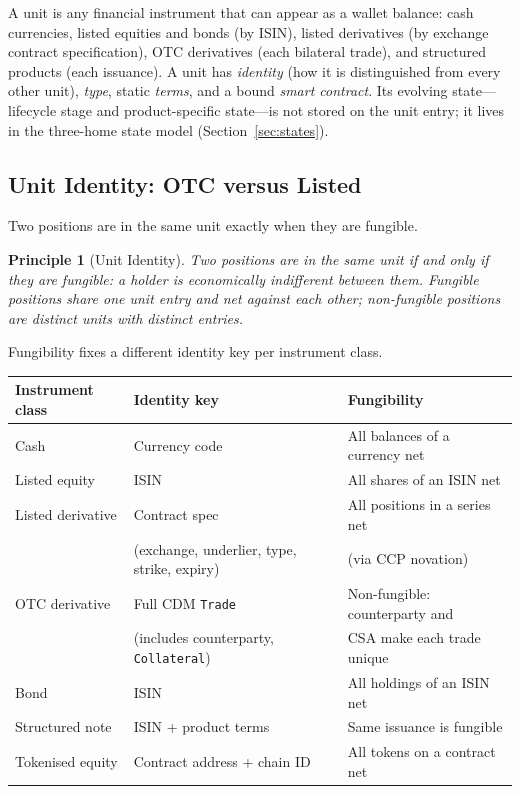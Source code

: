 \documentclass[11pt,a4paper]{article}
\newtheorem{principle}[definition]{Principle}
\begin{document}
A unit is any financial instrument that can appear as a wallet balance: cash currencies, listed equities and bonds (by ISIN), listed derivatives (by exchange contract specification), OTC derivatives (each bilateral trade), and structured products (each issuance). A unit has \emph{identity} (how it is distinguished from every other unit), \emph{type}, static \emph{terms}, and a bound \emph{smart contract}. Its evolving state---lifecycle stage and product-specific state---is not stored on the unit entry; it lives in the three-home state model (Section~\ref{sec:states}).

\subsection{Unit Identity: OTC versus Listed}
\label{sec:unit-identity}

Two positions are in the same unit exactly when they are fungible.

\begin{principle}[Unit Identity]
\label{prin:unit-identity}
Two positions are in the same unit if and only if they are fungible: a holder is economically indifferent between them. Fungible positions share one unit entry and net against each other; non-fungible positions are distinct units with distinct entries.
\end{principle}

Fungibility fixes a different identity key per instrument class.

\begin{center}
\small
\begin{tabular}{lll}
\toprule
\textbf{Instrument class} & \textbf{Identity key} & \textbf{Fungibility} \\
\midrule
Cash & Currency code & All balances of a currency net \\
Listed equity & ISIN & All shares of an ISIN net \\
Listed derivative & Contract spec & All positions in a series net \\
 & (exchange, underlier, type, strike, expiry) & (via CCP novation) \\
OTC derivative & Full CDM \texttt{Trade} & Non-fungible: counterparty and \\
 & (includes counterparty, \texttt{Collateral}) & CSA make each trade unique \\
Bond & ISIN & All holdings of an ISIN net \\
Structured note & ISIN + product terms & Same issuance is fungible \\
Tokenised equity & Contract address + chain ID & All tokens on a contract net \\
\bottomrule
\end{tabular}
\end{center}
\end{document}

